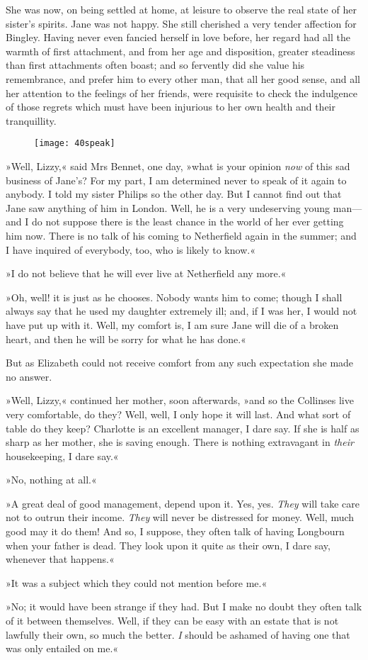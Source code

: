 She was now, on being settled at home, at leisure to observe the real state of her sister's spirits. Jane was not happy. She still cherished a very tender affection for Bingley. Having never even fancied herself in love before, her regard had all the warmth of first attachment, and from her age and disposition, greater steadiness than first attachments often boast; and so fervently did she value his remembrance, and prefer him to every other man, that all her good sense, and all her attention to the feelings of her friends, were requisite to check the indulgence of those regrets which must have been injurious to her own health and their tranquillity.

\begin{figure}[h!]
\centering
\texttt{[image: 40speak]}
\end{figure}

»Well, Lizzy,« said Mrs Bennet, one day, »what is your opinion \textit{now} of this sad business of Jane's? For my part, I am determined never to speak of it again to anybody. I told my sister Philips so the other day. But I cannot find out that Jane saw anything of him in London. Well, he is a very undeserving young man—and I do not suppose there is the least chance in the world of her ever getting him now. There is no talk of his coming to Netherfield again in the summer; and I have inquired of everybody, too, who is likely to know.«

»I do not believe that he will ever live at Netherfield any more.«

»Oh, well! it is just as he chooses. Nobody wants him to come; though I shall always say that he used my daughter extremely ill; and, if I was her, I would not have put up with it. Well, my comfort is, I am sure Jane will die of a broken heart, and then he will be sorry for what he has done.«

But as Elizabeth could not receive comfort from any such expectation she made no answer.

»Well, Lizzy,« continued her mother, soon afterwards, »and so the Collinses live very comfortable, do they? Well, well, I only hope it will last. And what sort of table do they keep? Charlotte is an excellent manager, I dare say. If she is half as sharp as her mother, she is saving enough. There is nothing extravagant in \textit{their} housekeeping, I dare say.«

»No, nothing at all.«

»A great deal of good management, depend upon it. Yes, yes. \textit{They} will take care not to outrun their income. \textit{They} will never be distressed for money. Well, much good may it do them! And so, I suppose, they often talk of having Longbourn when your father is dead. They look upon it quite as their own, I dare say, whenever that happens.«

»It was a subject which they could not mention before me.«

»No; it would have been strange if they had. But I make no doubt they often talk of it between themselves. Well, if they can be easy with an estate that is not lawfully their own, so much the better. \textit{I} should be ashamed of having one that was only entailed on me.«